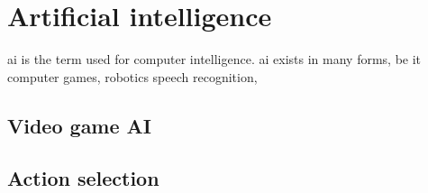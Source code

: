 \section{Artificial intelligence}
\ac{ai} is the term used for computer intelligence. \ac{ai} exists in many forms, be it computer games, robotics speech recognition, 


\subsection{Video game AI}

\subsection{Action selection}